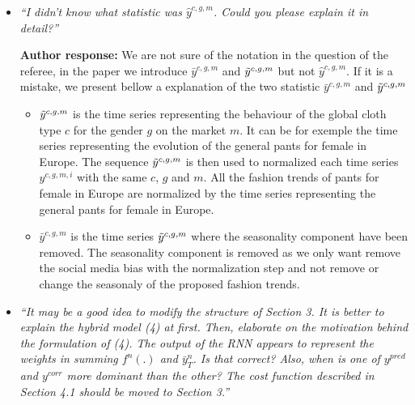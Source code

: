 \documentclass[10pt]{article} %
\begin{document}
\begin{itemize}
	\item {\em ``I didn't know what statistic was $\hat{y}^{c,g,m}$. Could you please explain it in detail?''} \medskip

	\textbf{Author response:} We are not sure of the notation in the question of the referee, in the paper we introduce $\bar{y}^{c,g,m}$ and $\Tilde{y}^{c,g,m}$ but not $\hat{y}^{c,g,m}$. If it is a mistake, we present bellow a explanation of the two statistic $\bar{y}^{c,g,m}$ and $\Tilde{y}^{c,g,m}$
	\begin{itemize}
	\item $\Tilde{y}^{c,g,m}$ is the time series representing the behaviour of the global cloth type $c$ for the gender $g$ on the market $m$. It can be for exemple the time series representing the evolution of the general pants for female in Europe. The sequence $\Tilde{y}^{c,g,m}$ is then used to normalized each time series $y^{c,g,m,i}$ with the same $c$, $g$ and $m$. All the fashion trends of pants for female in Europe are normalized by the time series representing the general pants for female in Europe. 
	\item $\bar{y}^{c,g,m}$ is the time series $\Tilde{y}^{c,g,m}$ where the seasonality component have been removed. The seasonality component is removed as we only want remove the social media bias with the normalization step and not remove or change the seasonaly of the proposed fashion trends.
	\end{itemize}	

	\item {\em ``It may be a good idea to modify the structure of Section 3. It is better to explain the hybrid model (4) at first.  Then, elaborate on the motivation behind the formulation of (4). The output of the RNN appears to represent the weights in summing $f^n(.)$ and $\bar{y}^n_{T}$. Is that correct? Also, when is one of $y^{pred}$ and $y^{corr}$ more dominant than the other? The cost function described in Section 4.1 should be moved to Section 3.''} \medskip


\end{itemize}
\end{document}
